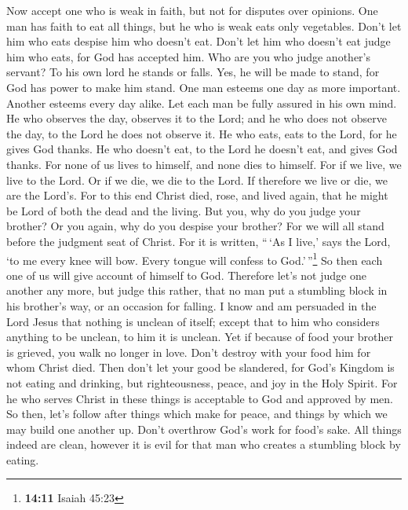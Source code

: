  Now accept one who is weak in faith, but not for disputes
over opinions.  One man has faith to eat all things, but
he who is weak eats only vegetables.  Don't let him who
eats despise him who doesn't eat. Don't let him who doesn't eat judge
him who eats, for God has accepted him.  Who are you who
judge another's servant? To his own lord he stands or falls. Yes, he
will be made to stand, for God has power to make him stand.
 One man esteems one day as more important. Another
esteems every day alike. Let each man be fully assured in his own mind.
 He who observes the day, observes it to the Lord; and he
who does not observe the day, to the Lord he does not observe it. He who
eats, eats to the Lord, for he gives God thanks. He who doesn't eat, to
the Lord he doesn't eat, and gives God thanks.  For none
of us lives to himself, and none dies to himself.  For if
we live, we live to the Lord. Or if we die, we die to the Lord. If
therefore we live or die, we are the Lord's.  For to this
end Christ died, rose, and lived again, that he might be Lord of both
the dead and the living.  But you, why do you judge your
brother? Or you again, why do you despise your brother? For we will all
stand before the judgment seat of Christ.  For it is
written, ``\,`As I live,' says the Lord, `to me every knee will bow.
Every tongue will confess to God.'\,''\footnote{\textbf{14:11} Isaiah
  45:23}  So then each one of us will give account of
himself to God.  Therefore let's not judge one another
any more, but judge this rather, that no man put a stumbling block in
his brother's way, or an occasion for falling.  I know
and am persuaded in the Lord Jesus that nothing is unclean of itself;
except that to him who considers anything to be unclean, to him it is
unclean.  Yet if because of food your brother is grieved,
you walk no longer in love. Don't destroy with your food him for whom
Christ died.  Then don't let your good be slandered,
 for God's Kingdom is not eating and drinking, but
righteousness, peace, and joy in the Holy Spirit.  For he
who serves Christ in these things is acceptable to God and approved by
men.  So then, let's follow after things which make for
peace, and things by which we may build one another up. 
Don't overthrow God's work for food's sake. All things indeed are clean,
however it is evil for that man who creates a stumbling block by eating.
